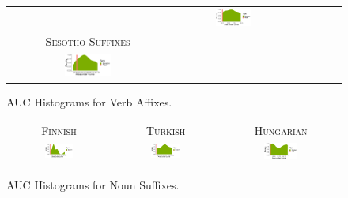 \documentclass[11pt,letterpaper]{article}
\begin{document}
\begin{figure}
\begin{tabular}{cccccc}
        &
            \includegraphics[width=0.3\textwidth]{figures/sesotho_prefixes/suffixes-byMorphemes-auc-hist-heldout-Coarse-FineSurprisal-optimized.pdf}
            \\
            \textsc{Sesotho Suffixes} \\
            \includegraphics[width=0.3\textwidth]{figures/sesotho_suffixes/suffixes-byMorphemes-auc-hist-heldout-Coarse-FineSurprisal-optimized.pdf}
    \end{tabular}

    
    \caption{AUC Histograms for Verb Affixes.}
    \label{fig:auc_verbs}
\end{figure}


\begin{figure}
\begin{tabular}{ccc}
\textsc{Finnish} & \textsc{Turkish} & \textsc{Hungarian} \\
    \includegraphics[width=0.3\textwidth]{figures/finnish_nouns/suffixes-byMorphemes-auc-hist-heldout-Coarse-FineSurprisal-optimized.pdf}
    &
    \includegraphics[width=0.3\textwidth]{figures/turkish_nouns/suffixes-byMorphemes-auc-hist-heldout-Coarse-FineSurprisal-optimized.pdf}
    &
    \includegraphics[width=0.3\textwidth]{figures/hungarian_nouns/suffixes-byMorphemes-auc-hist-heldout-Coarse-FineSurprisal-optimized.pdf}
    \end{tabular}
    \caption{AUC Histograms for Noun Suffixes.}
    \label{fig:auc_nouns}
\end{figure}
\end{document}
